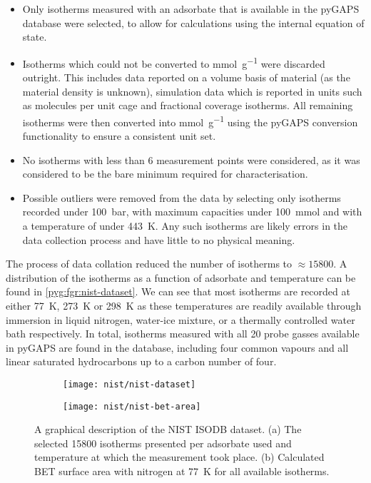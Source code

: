 \begin{itemize}
	\item Only isotherms measured with an adsorbate that is available
	      in the pyGAPS database were selected, to allow for calculations
	      using the internal equation of state.
	\item Isotherms which could not be converted to \si{\milli\mol\per\gram}
	      were discarded outright. This includes data reported
	      on a volume basis of material (as the material density is
	      unknown), simulation data which is reported in units such
	      as molecules per unit cage and fractional coverage isotherms.
	      All remaining isotherms were then converted into
	      \si{\milli\mol\per\gram} using the pyGAPS conversion
	      functionality to ensure a consistent unit set.
	\item No isotherms with less than 6 measurement points were
	      considered, as it was considered to be the bare
	      minimum required for characterisation.
	\item Possible outliers were removed from the data by selecting
	      only isotherms recorded under \SI{100}{\bar}, with maximum capacities
	      under \SI{100}{\milli\mol} and with a temperature of under
	      \SI{443}{\kelvin}. Any such isotherms are likely errors in the
	      data collection process and have little to no physical meaning.
\end{itemize}

The process of data collation reduced the number of isotherms
to \(\approx \! 15800\). A distribution of the isotherms as a
function of adsorbate and temperature can be found
in \autoref{pyg:fgr:nist-dataset}.
We can see that most isotherms are recorded at either
\SI{77}{\kelvin}, \SI{273}{\kelvin} or \SI{298}{\kelvin} as
these temperatures are readily available through immersion
in liquid nitrogen, water-ice mixture, or a thermally controlled
water bath respectively. In total, isotherms measured with all 20
probe gasses available in pyGAPS are found in the database,
including four common vapours and all linear saturated hydrocarbons
up to a carbon number of four.

\begin{figure}[htb]
	\centering

	\begin{subfigure}[b]{0.5\linewidth}
		\texttt{[image: nist/nist-dataset]}%
		\caption{}%
		\label{pyg:fgr:nist-dataset}
	\end{subfigure}%
	\begin{subfigure}[b]{0.45\linewidth}
		\texttt{[image: nist/nist-bet-area]}%
		\caption{}%
		\label{pyg:fgr:nist-dataset-area}
	\end{subfigure}%

	\caption{A graphical description of the NIST ISODB dataset.
		(a) The selected 15800 isotherms presented per adsorbate used
		and temperature at which the measurement took place.
		(b) Calculated BET surface area with nitrogen at \SI{77}{\kelvin}
		for all available isotherms. }%
	\label{pyg:fgr:nist-set}
\end{figure}

